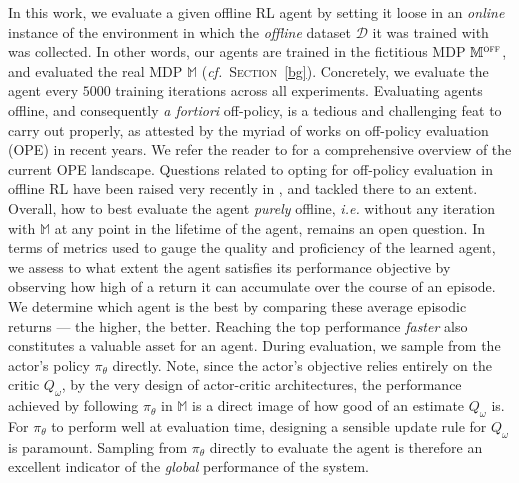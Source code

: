 In this work, we evaluate a given offline RL agent by setting it loose in an \emph{online} instance of the
environment in which the \emph{offline} dataset $\mathcal{D}$ it was trained with was collected.
In other words, our agents are trained in the fictitious MDP $\mathbb{M}^\textsc{off}$,
and evaluated the real MDP $\mathbb{M}$ (\textit{cf.}~\textsc{Section}~\ref{bg}).
Concretely, we evaluate the agent every $5000$ training iterations across all experiments.
Evaluating agents offline, and consequently \textit{a fortiori} off-policy,
is a tedious and challenging feat to carry out properly, as attested by the myriad of works on
off-policy evaluation (OPE) in recent years. We refer the reader to \cite{Voloshin2019-oi}
for a comprehensive overview of the current OPE landscape.
Questions related to opting for off-policy evaluation in offline RL have been raised very recently in
\cite{Le_Paine2020-sb},
and tackled there to an extent.
Overall, how to best evaluate the agent \emph{purely} offline,
\textit{i.e.} without any iteration with $\mathbb{M}$
at any point in the lifetime of the agent, remains an open question.
In terms of metrics used to gauge the quality and proficiency of the learned agent,
we assess to what extent the agent satisfies its performance objective
by observing how high of a return it can accumulate over the course of an episode.
We determine which agent is the best by comparing these average episodic returns ---
the higher, the better. Reaching the top performance \emph{faster} also constitutes a valuable asset for
an agent.
During evaluation, we sample from the actor's policy $\pi_\theta$ directly.
Note, since the actor's objective relies entirely on the critic $Q_\omega$,
by the very design of actor-critic architectures, the performance achieved by following $\pi_\theta$ in $\mathbb{M}$
is a direct image of how good of an estimate $Q_\omega$ is.
For $\pi_\theta$ to perform well at evaluation time, designing a sensible update rule for $Q_\omega$ is
paramount. Sampling from $\pi_\theta$ directly to evaluate the agent is therefore an excellent indicator
of the \emph{global} performance of the system.

